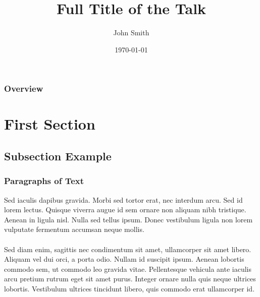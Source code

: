 \documentclass[compress]{beamer}
\title[Short title]{Full Title of the Talk} %
\author{John Smith} %
\institute[UCLA] %
{
University of California \\ %
\medskip
\textit{john@smith.com} %
}
\date{\today} %
\numberwithin{figure}{section}
\numberwithin{table}{section}
\numberwithin{equation}{section}
\numberwithin{thm}{section}
\numberwithin{defn}{section}
\numberwithin{lmm}{section}
\theoremstyle{example}
\numberwithin{figure}{section}
\numberwithin{table}{section}
\numberwithin{equation}{section}
\begin{document}
{
\begin{frame}
\titlepage %
\end{frame}
}

\begin{frame}
\frametitle{Overview} %
\tableofcontents[hideallsubsections] %
\end{frame}


\section{First Section} %

\subsection{Subsection Example} %

\begin{frame}
\frametitle{Paragraphs of Text}
Sed iaculis dapibus gravida. Morbi sed tortor erat, nec interdum arcu. Sed id lorem lectus. Quisque viverra augue id sem ornare non aliquam nibh tristique. Aenean in ligula nisl. Nulla sed tellus ipsum. Donec vestibulum ligula non lorem vulputate fermentum accumsan neque mollis.\\~\\

Sed diam enim, sagittis nec condimentum sit amet, ullamcorper sit amet libero. Aliquam vel dui orci, a porta odio. Nullam id suscipit ipsum. Aenean lobortis commodo sem, ut commodo leo gravida vitae. Pellentesque vehicula ante iaculis arcu pretium rutrum eget sit amet purus. Integer ornare nulla quis neque ultrices lobortis. Vestibulum ultrices tincidunt libero, quis commodo erat ullamcorper id.
\end{frame}
\end{document}
